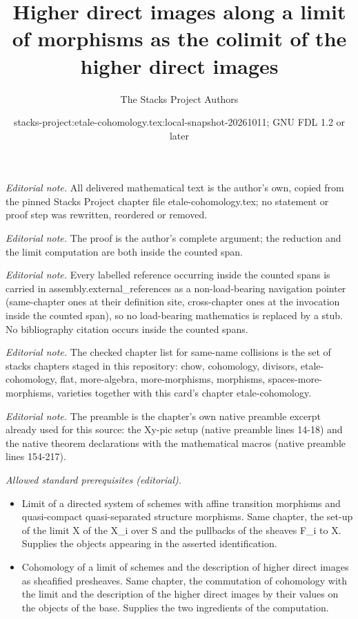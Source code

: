\documentclass[10pt,a4paper]{amsart}
\title{Higher direct images along a limit of morphisms as the colimit of the higher direct images}
\author{The Stacks Project Authors}
\date{stacks-project:etale-cohomology.tex:local-snapshot-20261011; GNU FDL 1.2 or later}
\theoremstyle{plain}
\theoremstyle{definition}
\theoremstyle{remark}
\numberwithin{equation}{subsection}
\begin{document}
\maketitle
\noindent\textit{Editorial note.} All delivered mathematical text is the author's own, copied from the pinned Stacks Project chapter file etale-cohomology.tex; no statement or proof step was rewritten, reordered or removed.\par\medskip
\noindent\textit{Editorial note.} The proof is the author's complete argument; the reduction and the limit computation are both inside the counted span.\par\medskip
\noindent\textit{Editorial note.} Every labelled reference occurring inside the counted spans is carried in assembly.external\_references as a non-load-bearing navigation pointer (same-chapter ones at their definition site, cross-chapter ones at the invocation inside the counted span), so no load-bearing mathematics is replaced by a stub. No bibliography citation occurs inside the counted spans.\par\medskip
\noindent\textit{Editorial note.} The checked chapter list for same-name collisions is the set of stacks chapters staged in this repository: chow, cohomology, divisors, etale-cohomology, flat, more-algebra, more-morphisms, morphisms, spaces-more-morphisms, varieties together with this card's chapter etale-cohomology.\par\medskip
\noindent\textit{Editorial note.} The preamble is the chapter's own native preamble excerpt already used for this source: the Xy-pic setup (native preamble lines 14-18) and the native theorem declarations with the mathematical macros (native preamble lines 154-217).\par\medskip
\noindent\textit{Allowed standard prerequisites (editorial).}\begin{itemize}
\item Limit of a directed system of schemes with affine transition morphisms and quasi-compact quasi-separated structure morphisms. Same chapter, the set-up of the limit X of the X\_i over S and the pullbacks of the sheaves F\_i to X. Supplies the objects appearing in the asserted identification.
\item Cohomology of a limit of schemes and the description of higher direct images as sheafified presheaves. Same chapter, the commutation of cohomology with the limit and the description of the higher direct images by their values on the objects of the base. Supplies the two ingredients of the computation.
\end{itemize}\medskip
\end{document}
